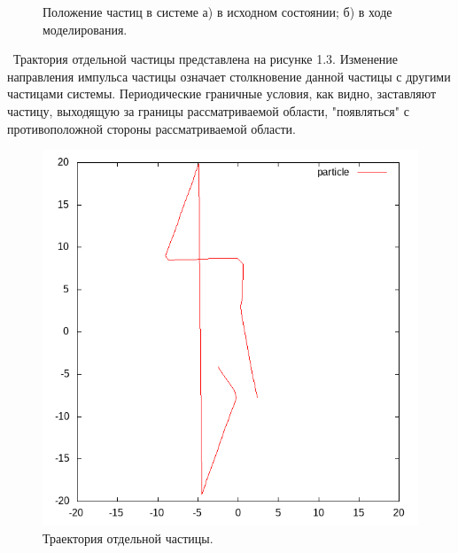 \documentclass[14pt,a4paper,report]{ncc}
\begin{document}
\begin{figure}[!h]
\begin{minipage}[!h]{0.5\linewidth}
\end{minipage}
\caption{Положение частиц в системе а) в исходном состоянии; б) в ходе моделирования.}
\end{figure}
 \
Трактория отдельной частицы представлена на рисунке 1.3. Изменение направления импульса частицы означает столкновение данной частицы с другими частицами системы. Периодические граничные условия, как видно, заставляют частицу, выходящую за границы рассматриваемой области, "появляться" с противоположной стороны рассматриваемой области.
\begin{figure}[!h]
\includegraphics[scale=0.8]{particle}
\caption{Траектория отдельной частицы.}
\end{figure}
 \
\end{document}
